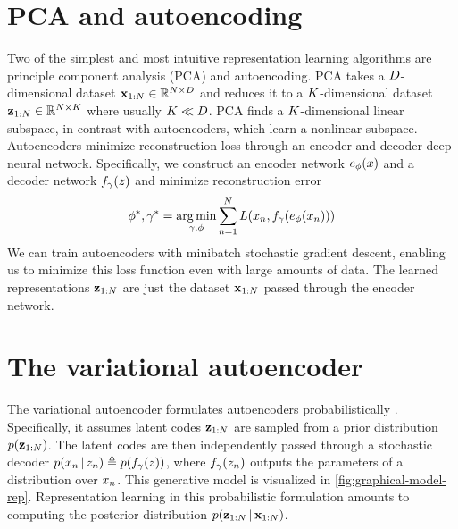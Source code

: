 \section{PCA and autoencoding}
Two of the simplest and most intuitive
representation learning algorithms
are principle component analysis (PCA)
and autoencoding.
PCA takes a $D$-dimensional dataset 
$\mathbf{x}_{1:N} \in \mathbb{R}^{N \times D}$ and
reduces it to a $K$-dimensional
dataset $\mathbf{z}_{1:N} \in \mathbb{R}^{N \times K}$
where usually $K \ll D$.
PCA finds a $K$-dimensional
linear subspace,
in contrast with autoencoders,
which learn a nonlinear subspace.
Autoencoders
minimize reconstruction loss
through an encoder
and decoder deep neural network.
Specifically, we construct
an encoder network $e_\phi(x)$
and a decoder network $f_\gamma(z)$
and minimize reconstruction error
\begin{align*}
\phi^*, \gamma^* = \operatorname*{arg\,min}_{\gamma, \phi} \sum _{n = 1}^N L(x_n, f_\gamma(e_\phi(x_n)))
\end{align*}
We can train autoencoders
with minibatch stochastic gradient descent,
enabling us to 
minimize this loss function
even with large amounts of data.
The learned representations 
$\mathbf{z}_{1:N}$ are just the dataset $\mathbf{x}_{1:N}$
passed through the encoder network.

\section{The variational autoencoder}
The variational autoencoder \citep[VAEs; ][]{Kingma2013, Rezende2014}
formulates autoencoders probabilistically .
Specifically, it
assumes
latent codes $\mathbf{z}_{1:N}$
are sampled from a
prior distribution $p(\mathbf{z}_{1:N})$.
The latent codes
are then independently passed through a stochastic decoder
$p(x_n \,|\, z_n) \triangleq p(f_\gamma(z))$,
where $f_\gamma(z_n)$ outputs
the parameters of a distribution over $x_n$.
This generative model is visualized in
\autoref{fig:graphical-model-rep}.
Representation learning in
this probabilistic formulation amounts to
computing the posterior distribution 
$p(\mathbf{z}_{1:N} \,|\, \mathbf{x}_{1:N})$.

